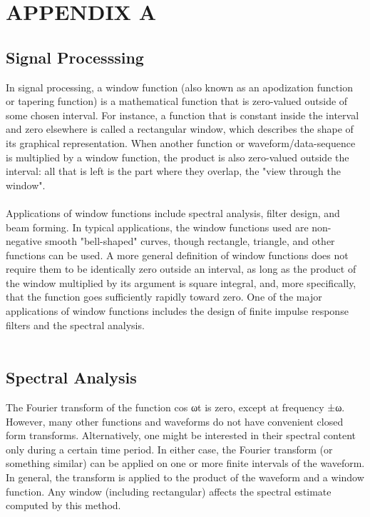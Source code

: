 \clearpage
\appendix
\section*{APPENDIX A}
\setcounter{section}{8}
\subsection{Signal Processsing}
In signal processing, a window function (also known as an apodization function or tapering
function) is a mathematical function that is zero-valued outside of some chosen interval. For
instance, a function that is constant inside the interval and zero elsewhere is called
a rectangular window, which describes the shape of its graphical representation. When
another function or waveform/data-sequence is multiplied by a window function, the product
is also zero-valued outside the interval: all that is left is the part where they overlap, the
"view through the window".\\
\\
Applications of window functions include spectral analysis, filter design, and beam forming.
In typical applications, the window functions used are non-negative smooth "bell-shaped"
curves, though rectangle, triangle, and other functions can be used.
A more general definition of window functions does not require them to be identically zero
outside an interval, as long as the product of the window multiplied by its argument is square
integral, and, more specifically, that the function goes sufficiently rapidly toward zero.
One of the major applications of window functions includes the design of finite impulse
response filters and the spectral analysis.\\
\\
\subsection{Spectral Analysis}
The Fourier transform of the function cos ωt is zero, except at frequency ±ω. However, many
other functions and waveforms do not have convenient closed form transforms. Alternatively,
one might be interested in their spectral content only during a certain time period.
In either case, the Fourier transform (or something similar) can be applied on one or more
finite intervals of the waveform. In general, the transform is applied to the product of the
waveform and a window function. Any window (including rectangular) affects the spectral
estimate computed by this method.\\


